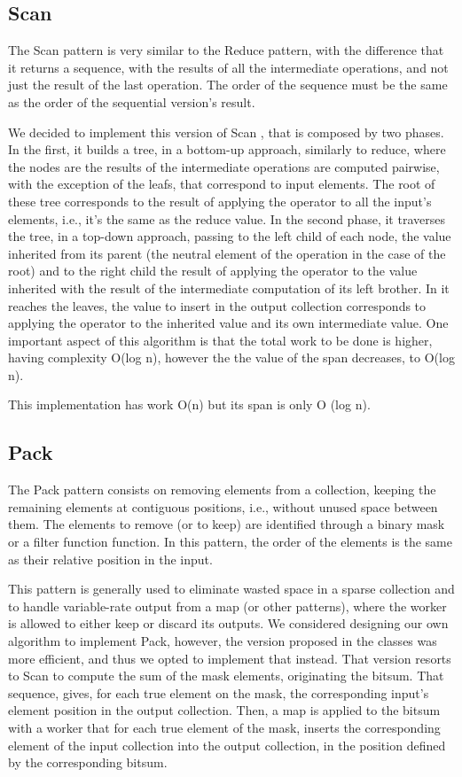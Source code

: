 \documentclass[conference,compsoc]{IEEEtran}
\begin{document}
\subsection{Scan}

The Scan pattern is very similar to the Reduce pattern,
with the difference that it returns a sequence, with the results of all the intermediate operations, and not just the result of the last operation.
The order of the sequence must be the same as the order of the sequential version's result.

We decided to implement this version of Scan \cite{ladner1980parallel}, that is composed by two phases.
In the first, it builds a tree, in a bottom-up approach, similarly to reduce, where the nodes are the results of the intermediate operations are computed pairwise, with the exception of the leafs, that correspond to input elements. The root of these tree corresponds to the result of applying the operator to all the input's elements, i.e., it's the same as the reduce value.
In the second phase, it traverses the tree, in a top-down approach, passing to the left child of each node, the value inherited from its parent (the neutral element of the operation in the case of the root) and to the right child the result of applying the operator to the value inherited with the result of the intermediate computation of its left brother. In it reaches the leaves, the value to insert in the output collection corresponds to applying the operator to the inherited value and its own intermediate value.
One important aspect of this algorithm is that the total work to be done is higher, having complexity O(log n), however the the value of the span decreases, to O(log n).

This implementation has work O(n) but its span is only O (log n).

\subsection{Pack}

The Pack pattern consists on removing elements from a collection, keeping the remaining elements at contiguous positions, i.e., without unused space between them. The elements to remove (or to keep) are identified through a binary mask or a filter function function. In this pattern, the order of the elements is the same as their relative position in the input.

This pattern is generally used to eliminate wasted space in a sparse collection and to handle variable-rate output from a map (or other patterns), where the worker is allowed to either keep or discard its outputs.
We considered designing our own algorithm to implement Pack, however, the version proposed in the classes was more efficient, and thus we opted to implement that instead. That version resorts to Scan to compute the sum of the mask elements, originating the bitsum. That sequence, gives, for each true element on the mask, the corresponding input's element position in the output collection. Then, a map is applied to the bitsum with a worker that for each true element of the mask, inserts the corresponding element of the input collection into the output collection, in the position defined by the corresponding bitsum.
\end{document}
